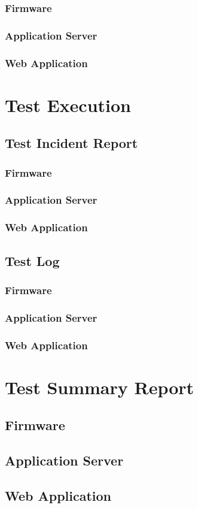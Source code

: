 \documentclass[a4paper,10pt]{article}
\begin{document}
		\subsubsection{Firmware}
		\subsubsection{Application Server}
		\subsubsection{Web Application}
	
	\section{Test Execution}
		\subsection{Test Incident Report}
			\subsubsection{Firmware}
			\subsubsection{Application Server}
			\subsubsection{Web Application}
	
		\subsection{Test Log}
			\subsubsection{Firmware}
			\subsubsection{Application Server}
			\subsubsection{Web Application}
	
	\section{Test Summary Report}
		\subsection{Firmware}
		\subsection{Application Server}
		\subsection{Web Application}
			
\end{document}
